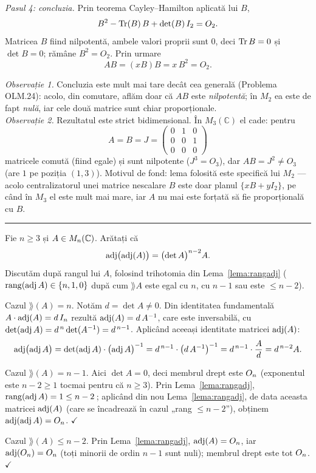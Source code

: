 \emph{Pasul 4: concluzia.} Prin teorema Cayley--Hamilton aplicată lui $B$,
\[ B^2-\operatorname{Tr}(B)\,B+\det(B)\,I_2=O_2 . \]
Matricea $B$ fiind nilpotentă, ambele valori proprii sunt $0$, deci $\operatorname{Tr} B=0$ și $\det B=0$; rămâne $B^2=O_2$. Prin urmare
\[ AB=(xB)B=x\,B^2=O_2 . \]

\emph{Observație 1.} Concluzia este mult mai tare decât cea generală (Problema OLM.24): acolo, din comutare, aflăm doar că $AB$ este \emph{nilpotentă}; în $M_2$ ea este de fapt \emph{nulă}, iar cele două matrice sunt chiar proporționale.\\[2pt]
\emph{Observație 2.} Rezultatul este strict bidimensional. În $M_3(\mathbb{C})$ el cade: pentru
\[ A=B=J=\begin{pmatrix}0&1&0\\0&0&1\\0&0&0\end{pmatrix} \]
matricele comută (fiind egale) și sunt nilpotente ($J^3=O_3$), dar $AB=J^2\neq O_3$ (are $1$ pe poziția $(1,3)$). Motivul de fond: lema folosită este specifică lui $M_2$ --- acolo centralizatorul unei matrice nescalare $B$ este doar planul $\{xB+yI_2\}$, pe când în $M_3$ el este mult mai mare, iar $A$ nu mai este forțată să fie proporțională cu $B$.
\vspace{1mm}\hrule

Fie $n \geq 3$ și $A \in M_n(\mathbb{C})$. Arătați că
\[
  \operatorname{adj}\bigl(\operatorname{adj}(A)\bigr) = \bigl(\det A\bigr)^{n-2} A.
\]
\sol Discutăm după rangul lui $A$, folosind trihotomia din Lema~\ref{lema:rangadj} ($\operatorname{rang}(\operatorname{adj} A) \in \{n,1,0\}$ după cum $\rang A$ este egal cu $n$, cu $n-1$ sau este $\leq n-2$).

Cazul $\rang(A) = n$. Notăm $d = \det A \neq 0$. Din identitatea fundamentală $A \cdot \operatorname{adj}(A) = d\,I_n$ rezultă $\operatorname{adj}(A) = d\,A^{-1}$, care este inversabilă, cu $\det(\operatorname{adj} A) = d^{\,n} \det(A^{-1}) = d^{\,n-1}$. Aplicând aceeași identitate matricei $\operatorname{adj}(A)$:
\[
  \operatorname{adj}\bigl(\operatorname{adj} A\bigr) = \det(\operatorname{adj} A) \cdot \bigl(\operatorname{adj} A\bigr)^{-1}
  = d^{\,n-1} \cdot \bigl(d\,A^{-1}\bigr)^{-1}
  = d^{\,n-1} \cdot \frac{A}{d} = d^{\,n-2} A.
\]

Cazul $\rang(A) = n-1$. Aici $\det A = 0$, deci membrul drept este $O_n$ (exponentul este $n-2 \geq 1$ tocmai pentru că $n \geq 3$). Prin Lema~\ref{lema:rangadj}, $\operatorname{rang}(\operatorname{adj} A) = 1 \leq n-2\,$; aplicând din nou Lema~\ref{lema:rangadj}, de data aceasta matricei $\operatorname{adj}(A)$ (care se încadrează în cazul „rang $\leq n-2$''), obținem $\operatorname{adj}(\operatorname{adj} A) = O_n$. $\checkmark$

Cazul $\rang(A) \leq n-2$. Prin Lema~\ref{lema:rangadj}, $\operatorname{adj}(A) = O_n$, iar $\operatorname{adj}(O_n) = O_n$ (toți minorii de ordin $n-1$ sunt nuli); membrul drept este tot $O_n$. $\checkmark$

